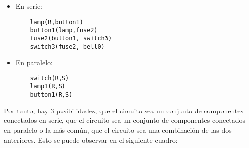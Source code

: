\documentclass{article}
\begin{document}
\begin{itemize}
  \item En serie:
  \begin{lstlisting}
    lamp(R,button1)
    button1(lamp,fuse2)
    fuse2(button1, switch3)
    switch3(fuse2, bell0)
  \end{lstlisting}
  \item En paralelo:
  \begin{lstlisting}
    switch(R,S)
    lamp1(R,S)
    button1(R,S)
  \end{lstlisting}

\end{itemize}

Por tanto, hay 3 posibilidades, que el circuito sea un conjunto de componentes conectados en serie, que el circuito sea un conjunto de componentes conectados en paralelo o la más común, que el circuito sea una combinación de las dos anteriores. Esto se puede observar en el siguiente cuadro:
\end{document}
